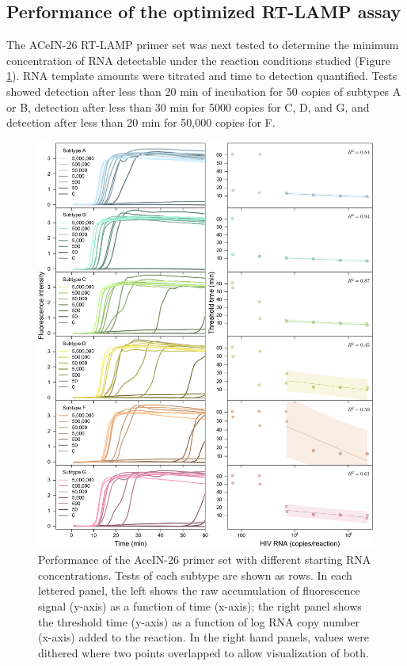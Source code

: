 \documentclass[../sherrill-Mix_thesis.tex]{subfiles}
\begin{document}
			\subsection{Performance of the optimized RT-LAMP assay}
			The ACeIN-26 RT-LAMP primer set was next tested to determine the minimum concentration of RNA detectable under the reaction conditions studied (Figure \ref{figClades}). RNA template amounts were titrated and time to detection quantified. Tests showed detection after less than 20 min of incubation for 50 copies of subtypes A or B, detection after less than 30 min for 5000 copies for C, D, and G, and detection after less than 20 min for 50,000 copies for F.

			\begin{figure}
				\centering
				\includegraphics[width=\textwidth]{3.pdf} %
				\caption[Performance of the AceIN-26 primer set with different starting RNA concentrations]{Performance of the AceIN-26 primer set with different starting RNA concentrations. Tests of each subtype are shown as rows. In each lettered panel, the left shows the raw accumulation of fluorescence signal (y-axis) as a function of time (x-axis); the right panel shows the threshold time (y-axis) as a function of log RNA copy number (x-axis) added to the reaction. In the right hand panels, values were dithered where two points overlapped to allow visualization of both.}
				\label{figClades}
			\end{figure}
\end{document}
